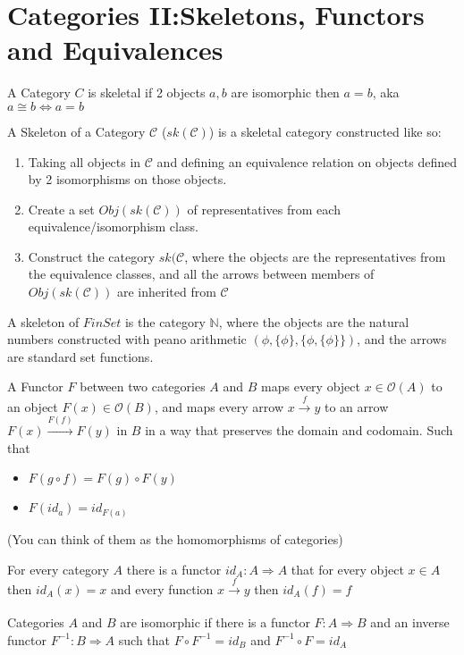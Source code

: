 \chapter{Categories II:Skeletons, Functors and Equivalences}
\begin{definition*}
    A Category $C$ is skeletal if 2 objects $a,b$ are isomorphic then $a =b$, aka $a \cong b \iff a =b$
\end{definition*}
\begin{definition*}
    A Skeleton of a Category $\mathcal{C}$ ($sk(\mathcal{C})$) is a skeletal category constructed like so:
    \begin{enumerate}
        \item Taking all objects in $\mathcal{C}$ and defining an equivalence relation on objects defined by 2 isomorphisms on those objects.
        \item Create a set $Obj(sk(\mathcal{C}))$ of representatives from each equivalence/isomorphism class.
        \item Construct the category $sk(\mathcal{C}$, where the objects are the representatives from the equivalence classes, and all the arrows between members of $Obj(sk(\mathcal{C}))$ are inherited from $\mathcal{C}$
    \end{enumerate}
\end{definition*}
\begin{example}
A skeleton of $FinSet$ is the category $\mathbb{N}$, where the objects are the natural numbers constructed with peano arithmetic $(\phi, \{\phi \}, \{\phi,\{\phi\}\})$, and the arrows are standard set functions.
\end{example}
\begin{definition*}
    A Functor $F$ between two categories $A$ and $B$ maps every object $x \in \mathcal{O}(A)$ to an object $F(x) \in \mathcal{O}(B)$, and maps every arrow $x \xrightarrow{f} y$ to an arrow $F(x) \xrightarrow{F(f)} F(y)$ in $B$ in a way that preserves the domain and codomain. Such that 
    \begin{itemize}
        \item $F(g \circ f)= F(g) \circ F(y)$
        \item $F(id_a)=id_{F(a)}$
    \end{itemize}
    (You can think of them as the homomorphisms of categories) 
\end{definition*}
\begin{definition*}
    For every category $A$ there is a functor $id_A: A \Rightarrow A$ that for every object $x \in A$ then $id_A(x)=x$ and every function $x \xrightarrow[]{f} y$ then $id_A(f)=f$
    
    Categories $A$ and $B$ are isomorphic if there is a functor $F: A \Rightarrow B$ and an inverse functor $F^{-1}: B \Rightarrow A$ such that $F \circ F^{-1}=id_B$ and $F^{-1}\circ F = id_A$
\end{definition*}

